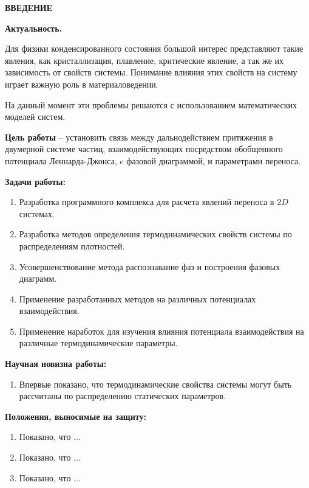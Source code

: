 
\newpage
\begin{center}
\textbf{ВВЕДЕНИЕ}
\end{center}



\textbf{Актуальность.}

Для физики конденсированного состояния большой интерес представляют такие явления, как кристаллизация, плавление, критические явление, а так же их зависимость от свойств системы. Понимание влияния этих свойств на систему играет важную роль в материаловедении.


На данный момент эти проблемы решаются с использованием математических моделей систем.



\textbf{Цель работы} --
установить связь между дальнодействием притяжения в двумерной системе частиц, взаимодействующих посредством обобщенного потенциала Леннарда-Джонса, c фазовой диаграммой, и параметрами переноса.

\textbf{Задачи работы:}
\begin{enumerate}
\item Разработка программного комплекса для расчета явлений переноса в $2D$ системах.
\item Разработка методов определения термодинамических свойств системы по распределениям плотностей. 
\item Усовершенствование метода распознавание фаз и построения фазовых диаграмм.
\item Применение разработанных методов на различных потенциалах взаимодействия.
\item Применение наработок для изучения влияния потенциала взаимодействия на различные термодинамические параметры.
\end{enumerate}

\textbf{Научная новизна работы:}
\begin{enumerate}
\item Впервые показано, что термодинамические свойства системы могут быть рассчитаны по распределению статических параметров.

\end{enumerate}

\textbf{Положения, выносимые на защиту:}
\begin{enumerate}
\item Показано, что ...

\item Показано, что ...

\item Показано, что ...

\end{enumerate}

